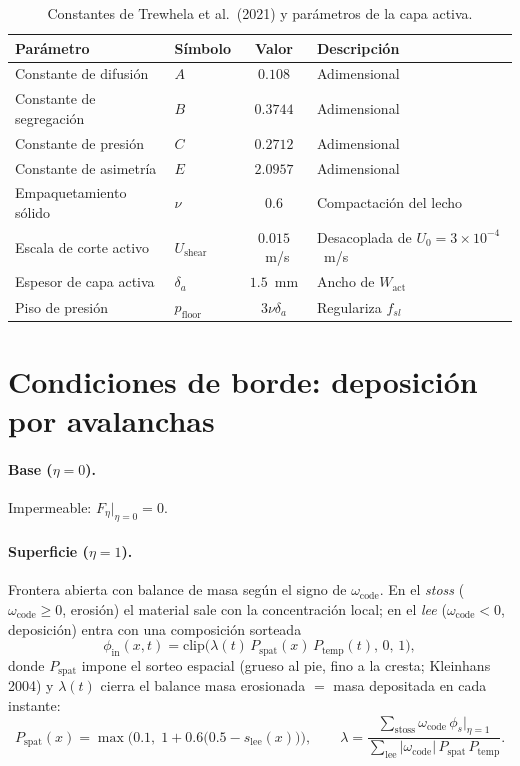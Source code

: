 \documentclass[11pt,a4paper]{article}
\begin{document}
\begin{table}[h!]
\centering
\caption{Constantes de Trewhela et al.\ (2021) y parámetros de la capa activa.}
\vspace{0.2cm}
\begin{tabular}{llcl}
\toprule
\textbf{Parámetro} & \textbf{Símbolo} & \textbf{Valor} & \textbf{Descripción}\\
\midrule
Constante de difusión    & $A$ & $0.108$ & Adimensional\\
Constante de segregación & $B$ & $0.3744$ & Adimensional\\
Constante de presión     & $C$ & $0.2712$ & Adimensional\\
Constante de asimetría   & $E$ & $2.0957$ & Adimensional\\
Empaquetamiento sólido   & $\nu$ & $0.6$ & Compactación del lecho\\
Escala de corte activo   & $U_{\mathrm{shear}}$ & $0.015$~m/s & Desacoplada de $U_0=3\times10^{-4}$~m/s\\
Espesor de capa activa   & $\delta_a$ & $1.5$~mm & Ancho de $W_{\mathrm{act}}$\\
Piso de presión          & $p_{\mathrm{floor}}$ & $3\nu\delta_a$ & Regulariza $f_{sl}$\\
\bottomrule
\end{tabular}
\end{table}

\section{Condiciones de borde: deposición por avalanchas}
\label{sec:borde}
\paragraph{Base ($\eta=0$).} Impermeable: $F_\eta|_{\eta=0}=0$.

\paragraph{Superficie ($\eta=1$).} Frontera abierta con balance de masa
según el signo de $\omega_{\mathrm{code}}$. En el \emph{stoss}
($\omega_{\mathrm{code}}\ge0$, erosión) el material sale con la
concentración local; en el \emph{lee} ($\omega_{\mathrm{code}}<0$,
deposición) entra con una composición sorteada
\begin{equation}
    \phi_{\mathrm{in}}(x,t) = \mathrm{clip}\!\Big(\lambda(t)\,P_{\mathrm{spat}}(x)\,P_{\mathrm{temp}}(t),\,0,\,1\Big),
\end{equation}
donde $P_{\mathrm{spat}}$ impone el sorteo espacial (grueso al pie, fino a
la cresta; Kleinhans 2004) y $\lambda(t)$ cierra el balance masa
erosionada $=$ masa depositada en cada instante:
\begin{equation}
    P_{\mathrm{spat}}(x) = \max\!\Big(0.1,\; 1 + 0.6\big(0.5 - s_{\mathrm{lee}}(x)\big)\Big),
    \qquad
    \lambda = \frac{\sum_{\mathrm{stoss}} \omega_{\mathrm{code}}\,\phi_s|_{\eta=1}}{\sum_{\mathrm{lee}} |\omega_{\mathrm{code}}|\,P_{\mathrm{spat}}\,P_{\mathrm{temp}}}.
\end{equation}
\end{document}
